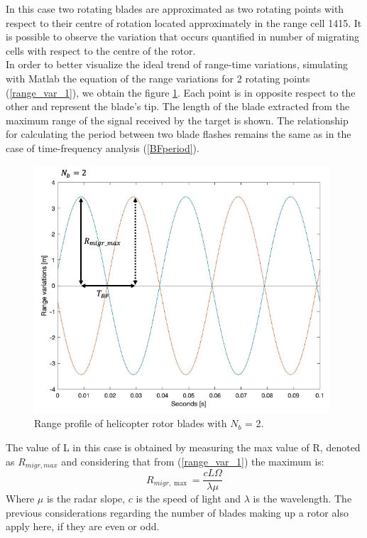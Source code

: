 \begin{itemize}
    In this case two rotating blades are approximated as two rotating points with respect to their centre of rotation located approximately in the range cell 1415. It is possible to observe the variation that occurs quantified in number of migrating cells with respect to the centre of the rotor.\\ 
    In order to better visualize the ideal trend of range-time variations, simulating with Matlab the equation of the range variations for 2 rotating points (\ref{range_var_1}), we obtain the figure \ref{r-t_helicopter_N_odd}. Each point is in opposite respect to the other and represent the blade's tip. The length of the blade extracted from the maximum range of the signal received by the target is shown. The relationship for calculating the period between two blade flashes remains the same as in the case of time-frequency analysis (\ref{BFperiod}).
    
    \begin{figure}[h!]
    \centering
    \includegraphics[width=11cm]{FMCW mD analysis-chap4/img/rho-t plane features.png}
    \caption{Range profile of helicopter rotor blades with $N_b$ = 2.}
    \label{r-t_helicopter_N_odd}
    \end{figure}
    
    The value of L in this case is obtained by measuring the max value of R, denoted as $R_{migr, max}$ and considering that from (\ref{range_var_1}) the maximum is:
    \begin{equation}
    R_{migr, \max }=\frac{c L \Omega}{\lambda \mu}   
    \label{Rmigrmax}
    \end{equation} 
     Where $\mu$ is the radar slope, $c$ is the speed of light and $\lambda$ is the wavelength. The previous considerations regarding the number of blades making up a rotor also apply here, if they are even or odd.
  
\end{itemize}

